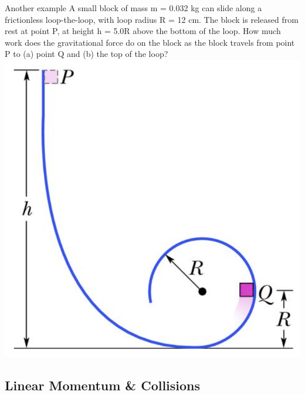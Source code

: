 \begin{frame}{Another example}
\small
A small block of mass m = 0.032 kg can slide along a frictionless loop-the-loop, with loop radius R = 12 cm. The block is released from rest at point P, at height h = 5.0R above the bottom of the loop. How much work does the gravitational force do on the block as the block travels from point P to (a) point Q and (b) the top of the loop? \\
\includegraphics[scale=0.3]{loop}
\vspace{5cm}
\end{frame}






 \subsection{Linear Momentum \& Collisions}

